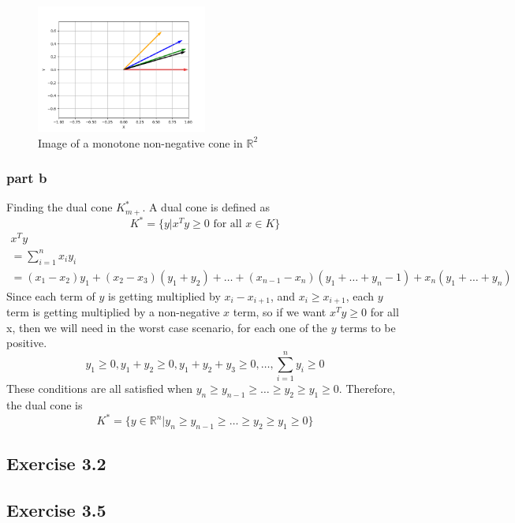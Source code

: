\begin{figure}[htbp]
  \centerline{\includegraphics[width=0.50\textwidth]{hw2/images/exercise233cone.png}}
  \caption{Image of a monotone non-negative cone in $\mathbb{R}^2$}
  \label{fig:exercise233cone}
\end{figure}
\subsubsection{part b}
Finding the dual cone $K_{m+}^*$. A dual cone is defined as 
\begin{equation}
  K^* = \{ y | x^T y \geq 0 \text{ for all } x\in K \}
\end{equation}
\begin{gather}
  x^T y \\
  = \sum_{i=1}^n x_i y_i \\
  = (x_1 - x_2)y_1 + (x_2 -x_3)(y_1+y_2) + \dots + (x_{n-1} - x_n)(y_1+\dots + y_n-1) + x_n(y_1+\dots + y_n)
\end{gather}
Since each term of $y$ is getting multiplied by $x_i - x_{i+1}$, and $x_i \geq x_{i+1}$, each $y$ term is getting multiplied by a non-negative $x$ term, so if we want $x^T y \geq 0$ for all x, then we will need in the worst case scenario, for each one of the $y$ terms to be positive.
\begin{equation}
  y_1 \geq 0, y_1 + y_2 \geq 0, y_1 + y_2 + y_3 \geq 0, \dots, \sum_{i=1}^{n} y_i \geq 0
\end{equation}
These conditions are all satisfied when $y_n \geq y_{n-1} \geq \dots \geq y_2 \geq y_1 \geq 0$. Therefore, the dual cone is 
\begin{equation}
  K^* = \{ y \in \mathbb{R}^n | y_n \geq y_{n-1} \geq \dots \geq y_2 \geq y_1 \geq 0\}
\end{equation}
\subsection{Exercise 3.2}

\subsection{Exercise 3.5}

